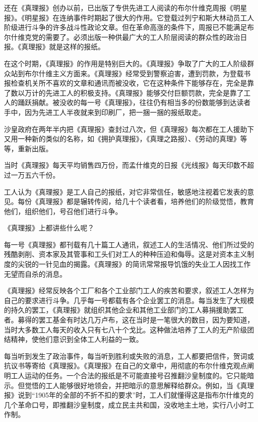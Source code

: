 还在《真理报》创办以前，已出版了专供先进工人阅读的布尔什维克周报《明星报》。《明星报》在连纳事件时期起了很大的作用。它登载过列宁和斯大林动员工人阶级进行斗争的许多战斗性政论文章。但在革命高涨的条件下，周报已不能满足布尔什维克党的需要了。必须出版一种供最广大的工人阶层阅读的群众性的政治日报。《真理报》就是这样的报纸。

在这个时期，《真理报》的作用是特别巨大的。《真理报》争取了广大的工人阶级群众站到布尔什维主义方面来。《真理报》经常受到警察迫害，遭到罚款，为登载书报检查机关所不喜欢的文章和通讯而被没收，它在这种条件下能够存在，完全是靠了数以万计的先进工人的积极支持。《真理报》能够交付巨额罚款，完全是靠了工人的踊跃捐献。被没收的每一号《真理报》，往往仍有相当多的份数能够到达读者手中，因为先进工人半夜就来到印刷厂，把一捆一捆的报纸取走。

沙皇政府在两年半内把《真理报》查封过八次，但《真理报》每次都在工人援助下又用一种新的类似的名称，如《拥护真理报》，《真理之路报）、《劳动的真理》等等，重新出版。

当时《真理报》每天平均销售四万份，而孟什维克的日报《光线报》每天印数不超过一万五六千份。

工人认为《真理报》是工人自己的报纸，对它非常信任，敏感地注视着它发表的意见。每份《真理报》都是辗转传阅，给几十个读者看，培养他们的阶级觉悟，教育他们，组织他们，号召他们进行斗争。

《真理报》上都讲些什么呢？

每一号《真理报》都刊载有几十篇工人通讯，叙述工人的生活情况、他们所过受的残酷剥削、资本家及其管事和工头们对工人的种种压迫和侮辱。这是对资本主义制度的尖锐的一针见血的揭露。《真理报》的简讯常常报导饥饿的失业工人因找工作无望而自杀的消息。

《真理报》经常反映各个工厂和各个工业部门工人的疾苦和要求，叙述工人怎样为自己的要求进行斗争。几乎每一号都载有各个企业罢工的消息。每当发生了大规模的持久的罢工，《真理报》就组织其他企业和其他工业部门的工人募捐援助罢工者。募得的罢工基金有时达几万卢布，这在当时是一笔很大的数目，因为要知道，当时大多数工人每天的收入只有七八十个戈比。这种做法培养了工人的无产阶级团结精神，使他们意识到全体工人利益的一致。

每当听到发生了政治事件，每当听到胜利或失败的消息，工人都要把信件，贺词或抗议书等寄给《真理报》。《真理报》在自己的文章中，用彻底的布尔什维克观点阐明工人运动的任务。一个合法的报纸是不可能直接号召推翻沙皇制度的。它只能暗示。但觉悟的工人能够很好地领会，并把暗示的意思解释给群众。例如，当《真理报》说到“1905年的全部的不折不扣的要求”时，工人们就懂得这是指布尔什维克的几个革命口号，即推翻沙皇制度，成立民主共和国，没收地主土地，实行八小时工作制。

